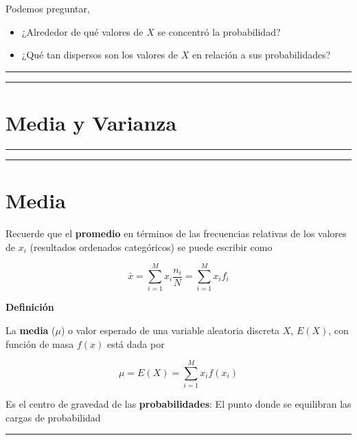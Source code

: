 \documentclass[
]{book}
\begin{document}
Podemos preguntar,

\begin{itemize}
\item
  ¿Alrededor de qué valores de \(X\) se concentró la probabilidad?
\item
  ¿Qué tan dispersos son los valores de \(X\) en relación a sus probabilidades?
\end{itemize}

\begin{center}\rule{0.5\linewidth}{0.5pt}\end{center}

\begin{center}\rule{0.5\linewidth}{0.5pt}\end{center}

\hypertarget{media-y-varianza-1}{%
\section{Media y Varianza}\label{media-y-varianza-1}}

\begin{center}\rule{0.5\linewidth}{0.5pt}\end{center}

\begin{center}\rule{0.5\linewidth}{0.5pt}\end{center}

\hypertarget{media}{%
\section{Media}\label{media}}

Recuerde que el \textbf{promedio} en términos de las frecuencias relativas de los valores de \(x_i\) (resultados ordenados categóricos) se puede escribir como

\[\bar{x}= \sum_{i=1}^M x_i \frac{n_i}{N}=\sum_{i=1}^M x_i f_i\]

\textbf{Definición}

La \textbf{media} (\(\mu\)) o valor esperado de una variable aleatoria discreta \(X\), \(E(X)\), con función de masa \(f(x)\) está dada por

\[\mu = E(X)= \sum_{i=1}^M x_i f(x_i)\]

Es el centro de gravedad de las \textbf{probabilidades}: El punto donde se equilibran las cargas de probabilidad

\begin{center}\rule{0.5\linewidth}{0.5pt}\end{center}
\end{document}
